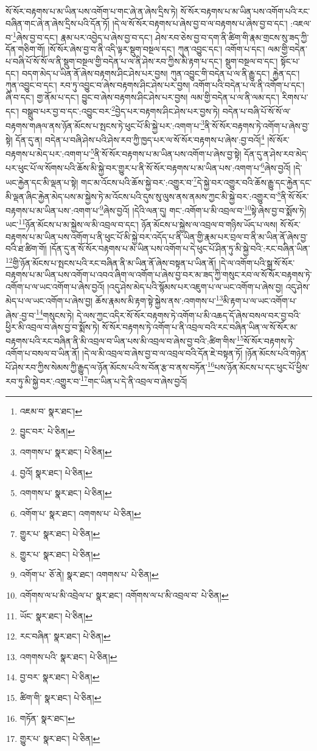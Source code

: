 སོ་སོར་བརྟགས་པ་མ་ཡིན་པས་འགོག་པ་གང་ཞེ་ན་ཞེས་དྲིས་ཏེ། སོ་སོར་བརྟགས་པ་མ་ཡིན་པས་འགོག་པའི་རང་བཞིན་གང་ཞེ་ན་ཞེས་དྲིས་པའི་དོན་ཏོ། །དེ་ལ་སོ་སོར་བརྟགས་པ་ཞེས་བྱ་བ་ལ་བརྟགས་པ་ཞེས་བྱ་བ་དང་། :འཇལ་བ་\footnote{འཇམ་བ་  སྣར་ཐང་། }ཞེས་བྱ་བ་དང་། རྣམ་པར་འབྱེད་པ་ཞེས་བྱ་བ་དང་། ཤེས་རབ་ཅེས་བྱ་བ་དག་ནི་ཚིག་གི་རྣམ་གྲངས་སུ་ཟད་ཀྱི་དོན་གཅིག་གོ། །སོ་སོར་ཞེས་བྱ་བ་ནི་འདི་ལྟར་སྡུག་བསྔལ་དང་། ཀུན་འབྱུང་དང་། འགོག་པ་དང་། ལམ་གྱི་བདེན་པ་བཞི་པོ་སོ་སོ་ལ་ནི་སྡུག་བསྔལ་གྱི་བདེན་པ་ལ་ནི་ཤེས་རབ་ཀྱིས་མི་རྟག་པ་དང་། སྡུག་བསྔལ་བ་དང་། སྟོང་པ་དང་། བདག་མེད་པ་ཡིན་ནོ་ཞེས་བརྟགས་ཤིང་ཤེས་པར་བྱས། ཀུན་འབྱུང་གི་བདེན་པ་ལ་ནི་རྒྱུ་དང་། རྐྱེན་དང་། ཀུན་འབྱུང་བ་དང་། རབ་ཏུ་འབྱུང་བ་ཞེས་བརྟགས་ཤིང་ཤེས་པར་བྱས། འགོག་པའི་བདེན་པ་ལ་ནི་འགོག་པ་དང་། ཞི་བ་དང་། གྱ་ནོམ་པ་དང་། བྱུང་བ་ཞེས་བརྟགས་ཤིང་ཤེས་པར་བྱས། ལམ་གྱི་བདེན་པ་ལ་ནི་ལམ་དང་། རིགས་པ་དང་། བསྒྲུབ་པར་བྱ་བ་དང་:འབྱུང་བར་\footnote{བྱུང་བར་  པེ་ཅིན། }བྱེད་པར་བརྟགས་ཤིང་ཤེས་པར་བྱས་ཏེ། བདེན་པ་བཞི་པོ་སོ་སོ་ལ་བརྟགས་གཞལ་ནས་ཉོན་མོངས་པ་སྤངས་ཏེ་ཕུང་པོ་མི་སྐྱེ་པར་:འགག་པ་\footnote{འགགས་པ་  སྣར་ཐང་།  པེ་ཅིན། }ནི་སོ་སོར་བརྟགས་ཏེ་འགོག་པ་ཞེས་བྱ་སྟེ། དོན་དུ་ན། བདེན་པ་བཞི་ཤེས་པའི་ཤེས་རབ་ཀྱི་ཁྱད་པར་ལ་སོ་སོར་བརྟགས་པ་ཞེས་:བྱ་བའོ།\footnote{བྱའོ།  སྣར་ཐང་།  པེ་ཅིན། } །སོ་སོར་བརྟགས་པ་མེད་པར་:འགག་པ་\footnote{འགགས་པ་  སྣར་ཐང་།  པེ་ཅིན། }ནི་སོ་སོར་བརྟགས་པ་མ་ཡིན་པས་འགོག་པ་ཞེས་བྱ་སྟེ། དོན་དུ་ན་ཤེས་རབ་མེད་པར་ཕུང་པོ་ལ་སོགས་པའི་ཆོས་མི་སྐྱེ་བར་གྱུར་པ་ནི་སོ་སོར་བརྟགས་པ་མ་ཡིན་པས་:འགག་པ་\footnote{འགོག་པ་  སྣར་ཐང་། འགགས་པ་  པེ་ཅིན། }ཞེས་བྱའོ། །དེ་ཡང་རྐྱེན་དང་མི་ལྡན་པ་སྟེ། གང་མ་འོངས་པའི་ཆོས་སྐྱེ་བར་:འགྱུར་བ་\footnote{གྱུར་པ་  སྣར་ཐང་།  པེ་ཅིན། }དེ་སྐྱེ་བར་འགྱུར་བའི་ཆོས་རྒྱུ་དང་རྐྱེན་དང་མི་ལྡན་ཞིང་རྐྱེན་མེད་པས་མ་སྐྱེས་ཏེ་མ་འོངས་པའི་དུས་སུ་ལུས་ནས་ནམས་ཀྱང་མི་སྐྱེ་བར་:འགྱུར་བ་\footnote{གྱུར་པ་  སྣར་ཐང་།  པེ་ཅིན། }ནི་སོ་སོར་བརྟགས་པ་མ་ཡིན་པས་:འགག་པ་\footnote{འགོག་པ་  ཅོ་ནེ།  སྣར་ཐང་། འགགས་པ་  པེ་ཅིན། }ཞེས་བྱའོ། །དེའི་ལན་དུ། གང་:འགོག་པ་མི་འབྲལ་བ་\footnote{འགོགས་ལ་པ་མི་འབྲེལ་པ་  སྣར་ཐང་། འགོགས་ལ་པ་མི་འབྲལ་བ་  པེ་ཅིན། }སྟེ་ཞེས་བྱ་བ་སྨོས་ཏེ། ཡང་\footnote{ཡོང་  སྣར་ཐང་།  པེ་ཅིན། }ཉོན་མོངས་པ་མ་སྐྱེས་ལ་མི་འབྲལ་བ་དང་། ཉོན་མོངས་པ་སྐྱེས་ལ་འབྲལ་བ་གཉིས་ཡོད་པ་ལས། སོ་སོར་བརྟགས་པ་མ་ཡིན་པས་འགོག་པ་ནི་ཕུང་པོ་མི་སྐྱེ་བར་འདོད་པ་ནི་ཡིན་གྱི་རྣམ་པར་བྲལ་བ་ནི་མ་ཡིན་ནོ་ཞེས་བྱ་བའི་ཐ་ཚིག་གོ། །དོན་དུ་ན་སོ་སོར་བརྟགས་པ་མ་ཡིན་པས་འགོག་པ་དེ་ཕུང་པོ་ཤིན་ཏུ་མི་སྐྱེ་བའི་:རང་བཞིན་ཡིན་\footnote{རང་བཞིན་  སྣར་ཐང་།  པེ་ཅིན། }གྱི་ཉོན་མོངས་པ་སྤངས་པའི་རང་བཞིན་ནི་མ་ཡིན་ནོ་ཞེས་བསྟན་པ་ཡིན་ནོ། །དེ་ལ་འགོག་པའི་སྒྲ་སོ་སོར་བརྟགས་པ་མ་ཡིན་པས་འགོག་པ་འབའ་ཞིག་ལ་འགོག་པ་ཞེས་བྱ་བར་མ་ཟད་ཀྱི་གསུང་རབ་ལ་སོ་སོར་བརྟགས་ཏེ་འགོག་པ་ལ་ཡང་འགོག་པ་ཞེས་བྱའོ། །འདུ་ཤེས་མེད་པའི་སྙོམས་པར་འཇུག་པ་ལ་ཡང་འགོག་པ་ཞེས་བྱ། འདུ་ཤེས་མེད་པ་ལ་ཡང་འགོག་པ་ཞེས་བྱ། ཆོས་རྣམས་མི་རྟག་སྟེ་སྐྱེས་ནས་:འགགས་པ་\footnote{འགགས་པའི་  སྣར་ཐང་།  པེ་ཅིན། }མི་རྟག་པ་ལ་ཡང་འགོག་པ་ཞེས་:བྱ་བ་\footnote{བྱ་བར་  སྣར་ཐང་།  པེ་ཅིན། }གསུངས་ཏེ། དེ་ལས་ཀྱང་འདིར་སོ་སོར་བརྟགས་ཏེ་འགོག་པ་མི་འཆད་དོ་ཞེས་བསལ་བར་བྱ་བའི་ཕྱིར་མི་འབྲལ་བ་ཞེས་བྱ་བ་སྨོས་ཏེ། སོ་སོར་བརྟགས་ཏེ་འགོག་པ་ནི་འབྲལ་བའི་རང་བཞིན་ཡིན་ལ་སོ་སོར་མ་བརྟགས་པའི་རང་བཞིན་ནི་མི་འབྲལ་བ་ཡིན་པས་མི་འབྲལ་བ་ཞེས་བྱ་བའི་:ཚིག་གིས་\footnote{ཚིག་གི་  སྣར་ཐང་།  པེ་ཅིན། }སོ་སོར་བརྟགས་ཏེ་འགོག་པ་བསལ་བ་ཡིན་ནོ། །དེ་ལ་མི་འབྲལ་བ་ཞེས་བྱ་བ་ལ་འབྲལ་བའི་དོན་ཇེ་བསྟན་ཏོ། །ཉོན་མོངས་པའི་གཉེན་པོ་ཤེས་རབ་ཀྱིས་སེམས་ཀྱི་རྒྱུད་ལ་ཉོན་མོངས་པའི་ས་བོན་རྩ་བ་ནས་བཏོན་\footnote{གཏོན་  སྣར་ཐང་། }པས་ཉོན་མོངས་པ་དང་ཕུང་པོ་ཕྱིས་རབ་ཏུ་མི་སྐྱེ་བར་:འགྱུར་བ་\footnote{གྱུར་པ་  སྣར་ཐང་།  པེ་ཅིན། }གང་ཡིན་པ་དེ་ནི་འབྲལ་བ་ཞེས་བྱའོ། 